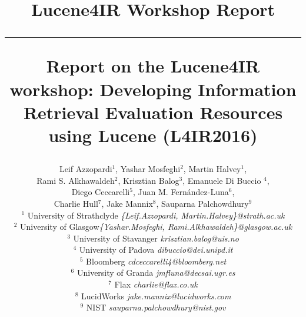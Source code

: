\documentclass[12pt]{article}
\begin{document}
\title{\vspace{-2.5cm}
\begin{center}
\textbf{\small{Lucene4IR Workshop Report}}\\\vspace{-0.5cm} \rule{17.5cm}{1pt}
\end{center}
\vspace{1cm}\textbf{Report on the Lucene4IR workshop: Developing Information Retrieval Evaluation Resources using Lucene (L4IR2016) }}

\newcommand{\todo}[1]{\textcolor{red}{#1}}
\author{
Leif Azzopardi$^{1}$, Yashar Mosfeghi$^{2}$, Martin Halvey$^{1}$, \\
 Rami S. Alkhawaldeh$^{2}$, Krisztian Balog$^{3}$, Emanuele Di Buccio $^{4}$, \\
Diego Ceccarelli$^{5}$, Juan M. Fern\'andez-Luna$^{6}$,\\
 Charlie Hull$^{7}$, Jake Mannix$^{8}$, Sauparna Palchowdhury$^{9}$\\ 
    $^{1}$ {\small University of Strathclyde  \emph{ \{Leif.Azzopardi, Martin.Halvey\}@strath.ac.uk}}\\
    $^{2}$ {\small University of Glasgow\emph{\small {\{Yashar.Mosfeghi, Rami.Alkhawaldeh\}@glasgow.ac.uk}}}\\
	$^{3}$ {\small University of Stavanger \emph{\small krisztian.balog@uis.no}}\\
	$^{4}$ {\small University of Padova \emph{\small dibuccio@dei.unipd.it}}\\
	$^{5}$ {\small Bloomberg \emph{\small cdceccarelli4@bloomberg.net}}\\	
	$^{6}$ {\small University of Granda \emph{\small jmfluna@decsai.ugr.es}}\\
	$^{7}$ {\small Flax \emph{\small charlie@flax.co.uk}}\\
	$^{8}$ {\small LucidWorks \emph{\small jake.mannix@lucidworks.com}}\\
	$^{9}$ {\small NIST \emph{\small sauparna.palchowdhury@nist.gov}}
}
\end{document}
